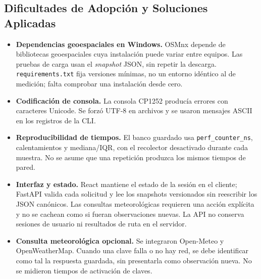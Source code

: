 \subsection{Dificultades de Adopción y Soluciones Aplicadas}
\begin{itemize}
    \item \textbf{Dependencias geoespaciales en Windows.} OSMnx depende de bibliotecas geoespaciales cuya instalación puede variar entre equipos. Las pruebas de carga usan el \textit{snapshot} JSON, sin repetir la descarga. \texttt{requirements.txt} fija versiones mínimas, no un entorno idéntico al de medición; falta comprobar una instalación desde cero.
    \item \textbf{Codificación de consola.} La consola CP1252 producía errores con caracteres Unicode. Se forzó UTF-8 en archivos y se usaron mensajes ASCII en los registros de la CLI.
    \item \textbf{Reproducibilidad de tiempos.} El banco guardado usa \texttt{perf\_counter\_ns}, calentamientos y mediana/IQR, con el recolector desactivado durante cada muestra. No se asume que una repetición produzca los mismos tiempos de pared.
    \item \textbf{Interfaz y estado.} React mantiene el estado de la sesión en el cliente; FastAPI valida cada solicitud y lee los snapshots versionados sin reescribir los JSON canónicos. Las consultas meteorológicas requieren una acción explícita y no se cachean como si fueran observaciones nuevas. La API no conserva sesiones de usuario ni resultados de ruta en el servidor.
    \item \textbf{Consulta meteorológica opcional.} Se integraron Open-Meteo y OpenWeatherMap. Cuando una clave falla o no hay red, se debe identificar como tal la respuesta guardada, sin presentarla como observación nueva. No se midieron tiempos de activación de claves.
\end{itemize}
